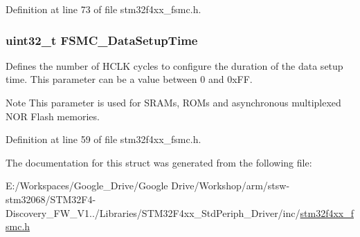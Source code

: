 Definition at line 73 of file stm32f4xx\-\_\-fsmc.\-h.

\hypertarget{struct_f_s_m_c___n_o_r_s_r_a_m_timing_init_type_def_a8c62c50435a67ef4de2f27b539c4c851}{
\subsubsection[{F\-S\-M\-C\-\_\-\-Data\-Setup\-Time}]{\setlength{\rightskip}{0pt plus 5cm}uint32\-\_\-t F\-S\-M\-C\-\_\-\-Data\-Setup\-Time}}\label{struct_f_s_m_c___n_o_r_s_r_a_m_timing_init_type_def_a8c62c50435a67ef4de2f27b539c4c851}
Defines the number of H\-C\-L\-K cycles to configure the duration of the data setup time. This parameter can be a value between 0 and 0x\-F\-F. \begin{DoxyNote}{Note}
This parameter is used for S\-R\-A\-Ms, R\-O\-Ms and asynchronous multiplexed N\-O\-R Flash memories. 
\end{DoxyNote}


Definition at line 59 of file stm32f4xx\-\_\-fsmc.\-h.



The documentation for this struct was generated from the following file\-:\begin{DoxyCompactItemize}
\item 
E\-:/\-Workspaces/\-Google\-\_\-\-Drive/\-Google Drive/\-Workshop/arm/stsw-\/stm32068/\-S\-T\-M32\-F4-\/\-Discovery\-\_\-\-F\-W\-\_\-\-V1../\-Libraries/\-S\-T\-M32\-F4xx\-\_\-\-Std\-Periph\-\_\-\-Driver/inc/\hyperlink{stm32f4xx__fsmc_8h}{stm32f4xx\-\_\-fsmc.\-h}\end{DoxyCompactItemize}
